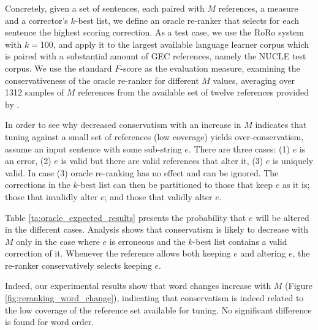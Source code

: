 \documentclass[a4paper, 11pt]{article}
\begin{document}
Concretely, given a set of sentences, each paired with $M$ references, a measure and a 
corrector's $k$-best list, we define an oracle re-ranker that selects for each sentence the highest scoring correction.
As a test case, we use the RoRo system with $k=100$, and apply it to the 
largest available language learner corpus which is paired with a substantial amount of GEC references,
namely the NUCLE test corpus. We use the standard $F$-score as the evaluation measure,
examining the conservativeness of the oracle re-ranker for different $M$ values, averaging over 1312 samples of 
$M$ references from the available set of twelve references provided by \citet{bryant2015far}.

In order to see why decreased conservatism with an increase in $M$ indicates
that tuning against a small set of references (low coverage) yields over-conservatism, 
assume an input sentence with some sub-string $e$. 
There are three cases: (1) $e$ is an error, (2) $e$ is valid but there are valid references that alter it, (3) $e$ is uniquely valid. In case (3) oracle re-ranking has no effect and can be ignored.
The corrections in the $k$-best list can then be partitioned to those that keep $e$ as it is; those that invalidly alter $e$; and those that validly alter $e$. 

Table \ref{ta:oracle_expected_results} presents the probability that $e$ will be altered in the different cases.
Analysis shows that conservatism is likely to decrease with $M$ only
in the case where $e$ is erroneous and the $k$-best list contains a valid correction of it.
Whenever the reference allows both keeping $e$ and altering $e$, the re-ranker conservatively selects keeping $e$. 

Indeed, our experimental results show that word changes increase with $M$ (Figure \ref{fig:reranking_word_change}),
indicating that conservatism is indeed related to the low coverage of the reference set available for tuning.
No significant difference is found for word order.
\end{document}
